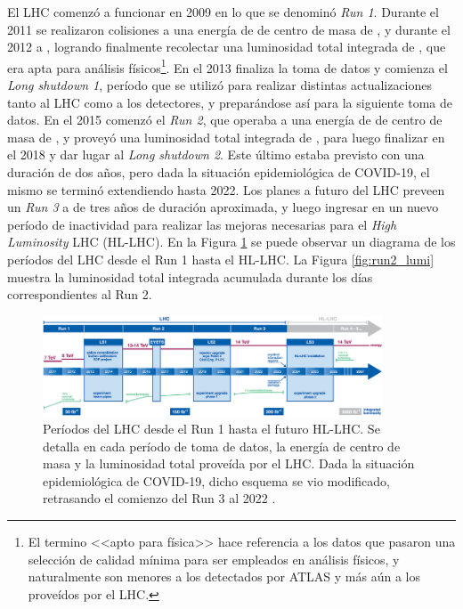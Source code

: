 El LHC comenzó a funcionar en 2009 en lo que se denominó \textit{Run 1}. Durante el 2011 se realizaron colisiones a una energía de de centro de masa de , y durante el 2012 a , logrando finalmente recolectar una luminosidad total integrada de  \cite{DAPR-2011-01,DAPR-2013-01}, que era apta para análisis físicos\footnote{El termino <<apto para física>> hace referencia a los datos que pasaron una selección de calidad mínima para ser empleados en análisis físicos, y naturalmente son menores a los detectados por ATLAS y más aún a los proveídos por el LHC.}. En el 2013 finaliza la toma de datos y comienza el \textit{Long shutdown 1}, período que se utilizó para realizar distintas actualizaciones tanto al LHC como a los detectores, y preparándose así para la siguiente toma de datos. En el 2015 comenzó el \textit{Run 2}, que operaba a una energía de de centro de masa de , y proveyó una luminosidad total integrada de  \cite{lumi_13tev}, para luego finalizar en el 2018 y dar lugar al \textit{Long shutdown 2}. Este último estaba previsto con una duración de dos años, pero dada la situación epidemiológica de COVID-19, el mismo se terminó extendiendo hasta 2022.
Los planes a futuro del LHC preveen un \textit{Run 3} a  de tres años de duración aproximada, y luego ingresar en un nuevo período de inactividad para realizar las mejoras necesarias para el \textit{High Luminosity} LHC (HL-LHC). En la Figura \ref{fig:lhc_periods} se puede observar un diagrama de los períodos del LHC desde el Run 1 hasta el HL-LHC. La Figura \ref{fig:run2_lumi} muestra la luminosidad total integrada acumulada durante los días correspondientes al Run 2.

\begin{figure}
  \centering
  \includegraphics[width=0.9\textwidth]{images/lhc/lhc_periods.png}
  \caption{Períodos del LHC desde el Run 1 hasta el futuro HL-LHC. Se detalla en cada período de toma de datos, la energía de centro de masa y la luminosidad total proveída por el LHC. Dada la situación epidemiológica de COVID-19, dicho esquema se vio modificado, retrasando el comienzo del Run 3 al 2022 \cite{lhc_periods}.}
  \label{fig:lhc_periods}
\end{figure}

